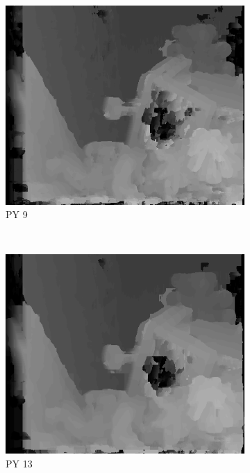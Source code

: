 \begin{figure}
  \begin{subfigure}[b]{0.23\textwidth}
    \centering
    \includegraphics[width=\textwidth]{images/stereo-pairs/teddy_pyramid_9.png}
    \caption{PY 9}
  \end{subfigure}
  ~
  \begin{subfigure}[b]{0.23\textwidth}
    \centering
    \includegraphics[width=\textwidth]{images/stereo-pairs/teddy_pyramid_13.png}
    \caption{PY 13}
  \end{subfigure}
  ~
  \begin{subfigure}[b]{0.23\textwidth}

\end{subfigure}
\end{figure}
